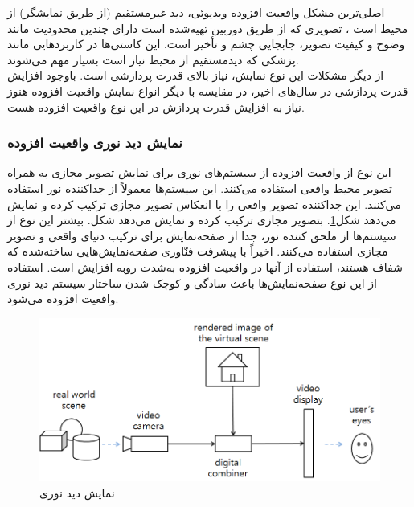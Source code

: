 اصلی‌ترین مشکل واقعیت افزوده ویدیوئی، دید غیرمستقیم (از طریق نمایشگر) از محیط است \cite{Billinghurst}، تصویری که از طریق دوربین تهیه‌شده است دارای چندین محدودیت مانند وضوح و کیفیت تصویر، جابجایی چشم و تأخیر است. این کاستی‌ها در کاربردهایی مانند پزشکی که دیدمستقیم از محیط نیاز است بسیار مهم می‌شوند.
\\
از دیگر مشکلات این نوع نمایش، نیاز بالای قدرت پردازشی است. باوجود افزایش قدرت پردازشی در سال‌های اخیر، در مقایسه با دیگر انواع نمایش واقعیت افزوده هنوز نیاز به افزایش قدرت پردازش در این نوع واقعیت افزوده هست.

\subsubsection{نمایش دید نوری واقعیت افزوده}
این نوع از واقعیت افزوده از سیستم‌های نوری برای نمایش تصویر مجازی به همراه تصویر محیط واقعی استفاده می‌کنند. این سیستم‌ها معمولاً از جداکننده نور استفاده می‌کنند. این جداکننده تصویر واقعی را با انعکاس تصویر مجازی ترکیب کرده و نمایش می‌دهد شکل\ref{fig:optical}. بتصویر مجازی ترکیب کرده و نمایش می‌دهد شکل. بیشتر این نوع از سیستم‌ها از ملحق کننده نور، جدا از صفحه‌نمایش برای ترکیب دنیای واقعی و تصویر مجازی استفاده می‌کنند. اخیراً با پیشرفت فنّاوری صفحه‌نمایش‌هایی ساخته‌شده که شفاف هستند، استفاده از آنها در واقعیت افزوده به‌شدت روبه افزایش است. استفاده از این نوع صفحه‌نمایش‌ها باعث سادگی و کوچک شدن ساختار سیستم دید نوری واقعیت افزوده می‌شود\cite{Billinghurst}.

\begin{figure}
	\centering
	\includegraphics[width=1\linewidth]{image/opticalview}
	\caption {نمایش دید نوری \cite{Billinghurst}}
	\label{fig:optical}
\end{figure}

